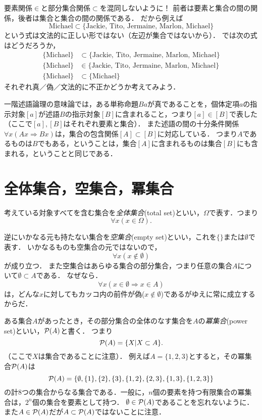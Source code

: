 \documentclass[11pt,a4paper]{jsarticle}
\begin{document}
\begin{attn}
要素関係$\in$と部分集合関係$\subset$を混同しないように！
前者は要素と集合の間の関係，後者は集合と集合の間の関係である．
だから例えば
\[
\text{Michael} \subset \{ \text{Jackie, Tito, Jermaine, Marlon, Michael}\}  
\]
という式は文法的に正しい形ではない（左辺が集合ではないから）．
では次の式はどうだろうか，
\begin{align*}
\{ \text{Michael} \} &\subset \{ \text{Jackie, Tito, Jermaine, Marlon, Michael}\}  \\
\{ \text{Michael} \} &\in \{ \text{Jackie, Tito, Jermaine, Marlon, Michael}\}  \\
\{ \text{Michael} \} &\subset \{ \text{Michael}\}   
\end{align*}
それぞれ真／偽／文法的に不正かどうか考えてみよう．
\end{attn}


\begin{example}
一階述語論理の意味論では，ある単称命題$Ba$が真であることを，個体定項$a$の指示対象$[a]$が述語$B$の指示対象$[B]$に含まれること，つまり$[a] \in [B]$で表した（ここで$[a], [B]$はそれぞれ要素と集合）．
また述語の間の十分条件関係$\forall x (Ax \Rightarrow Bx)$は，集合の包含関係$[A] \subset [B]$に対応している．
つまり$A$であるものは$B$でもある，ということは，集合$[A]$に含まれるものは集合$[B]$にも含まれる，ということと同じである．
\end{example}


\section{全体集合，空集合，冪集合}
考えている対象すべてを含む集合を\emph{全体集合}(total set)といい，$\Omega$で表す．つまり
\[
\forall x (x \in \Omega).
\]

逆にいかなる元も持たない集合を\emph{空集合}(empty set)といい，これを$\{\}$または$\emptyset$で表す．
いかなるものも空集合の元ではないので，
\[
\forall x (x \not\in \emptyset)
\]
が成り立つ．
また空集合はあらゆる集合の部分集合，つまり任意の集合$A$について$\emptyset \subset A$である．
なぜなら．
\[
\forall x (x \in \emptyset \Rightarrow x \in A)
\]
は，どんな$x$に対してもカッコ内の前件が偽($x \not\in \emptyset$)であるがゆえに常に成立するからだ．

ある集合$A$があったとき，その部分集合の全体のなす集合を$A$の\emph{冪集合}(power set)といい，$\mathcal{P}(A)$と書く．
つまり
\[
 \mathcal{P}(A) = \{ X| X \subset A \}.
\]
（ここで$X$は集合であることに注意）．
例えば$A = \{1, 2, 3\}$とすると，その冪集合$\mathcal{P}(A)$は
\[
 \mathcal{P}(A) = \{ \emptyset, \{1\}, \{2\}, \{3\}, \{1,2\}, \{2,3\}, \{1,3\}, \{1,2,3\} \}
\]
の計8つの集合からなる集合である．一般に，$n$個の要素を持つ有限集合の冪集合は，$2^n$個の集合を要素として持つ．
$\emptyset \in \mathcal{P}(A)$であることを忘れないように．
また$A \in \mathcal{P}(A)$だが$A \subset \mathcal{P}(A)$ではないことに注意．
\end{document}
